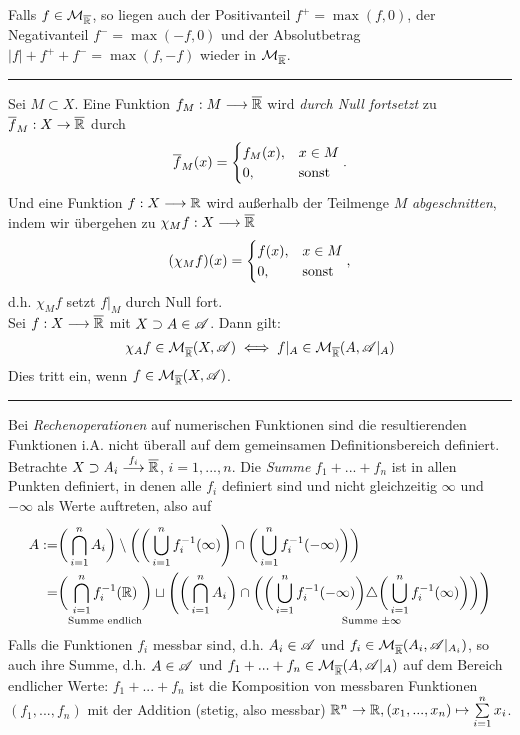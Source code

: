 \begin{korollar}
Falls $f \in \MM_{\ol\R}$, so liegen auch der Positivanteil $f^+=\max(f,0)$, der Negativanteil  $f^-=\max(-f,0)$ und der Absolutbetrag $|f|+f^++f^-=\max (f,-f)$ wieder in $\MM_{\ol\R}$.
\end{korollar}
\rule{\textwidth}{0.4pt}
Sei $M\subset X$. Eine Funktion $f_M:M\longrightarrow\ol\R$ wird \emph{durch Null fortsetzt} zu $\ol{f}_M:X\to\ol\R$ durch
$$
\ol{f}_M(x)=\begin{cases}
f_M(x), &x\in M\\
0, &\te{sonst}
\end{cases}.
$$
Und eine Funktion $f:X\longrightarrow \R$ wird außerhalb der Teilmenge $M$ \emph{abgeschnitten}, indem wir übergehen zu $\chi_M f:X \longrightarrow\ol{\R}$
$$
(\chi_M f)(x)=\begin{cases}
f(x), & x\in M\\
0, &\te{sonst}
\end{cases},
$$
d.h. $\chi_M f$ setzt $f|_M$ durch Null fort.\vspace{0.2pc}\\
Sei $f:X\longrightarrow \ol\R$ mit $X\supset A\in \AA$. Dann gilt:
$$
\chi_Af \in \MM_{\ol\R}(X,\AA) \iff f|_A \in \MM_{\ol\R}(A,\AA|_A)
$$
Dies tritt ein, wenn $f\in \MM_{\ol\R}(X,\AA)$.\\
\rule{\textwidth}{0.4pt}
Bei \emph{Rechenoperationen} auf numerischen Funktionen sind die resultierenden Funktionen i.A. nicht überall auf dem gemeinsamen Definitionsbereich definiert. Betrachte $X\supset A_i \overset{f_i}\longrightarrow \ol\R$, $i=1,...,n$. Die \emph{Summe} $f_1+...+f_n$ ist in allen Punkten definiert, in denen alle $f_i$ definiert sind und nicht gleichzeitig $\infty$ und $-\infty$ als Werte auftreten, also auf
\begin{equation*}
\begin{split}
A:= &\bigg( \bigcap_{i=1}^n A_i\bigg) \setminus \bigg( \bigg( \bigcup_{i=1}^n f^{-1}_i(\infty)\Bigg) \cap \bigg( \bigcup_{i=1}^n f_i^{-1}(-\infty) \bigg)\bigg)\\
= &\bigg(\underset{\te{Summe endlich}}{\bigcap_{i=1}^n f^{-1}_i(\R)}\bigg) \sqcup \Bigg( \bigg( \bigcap_{i=1}^n A_i \bigg) \cap \bigg( \underset{\te{Summe }\pm \infty}{\bigg( \bigcup_{i=1}^n f_i^{-1}(-\infty)\bigg) \triangle \bigg(\bigcup_{i=1}^n f^{-1}_i(\infty)\bigg)\bigg)}\Bigg)
\end{split}
\end{equation*}
Falls die Funktionen $f_i$ messbar sind, d.h. $A_i \in \AA$ und $f_i \in \MM_{\ol\R}(A_i,\AA|_{A_i})$, so auch ihre Summe, d.h. $A\in \AA$ und $f_1+...+f_n \in \MM_{\ol\R}(A,\AA|_A)$ auf dem Bereich endlicher Werte: $f_1+...+f_n$ ist die Komposition von messbaren Funktionen $(f_1,...,f_n)$ mit der Addition (stetig, also messbar) $\R^n \to \R, (x_1,...,x_n)\mapsto \sum\limits_{i=1}^n x_i$.

